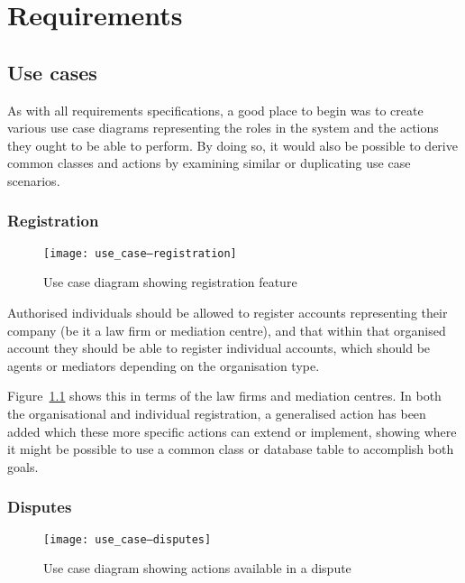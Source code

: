 \chapter{Requirements}

\section{Use cases}

As with all requirements specifications, a good place to begin was to create various use case diagrams representing the roles in the system and the actions they ought to be able to perform. By doing so, it would also be possible to derive common classes and actions by examining similar or duplicating use case scenarios.

\subsection{Registration}

\begin{figure}[h!]
  \centering
    \ifimages
    \texttt{[image: use\_case--registration]}
    \fi
  \caption{Use case diagram showing registration feature}
  \label{uml:useCase:registration}
\end{figure}

Authorised individuals should be allowed to register accounts representing their company (be it a law firm or mediation centre), and that within that organised account they should be able to register individual accounts, which should be agents or mediators depending on the organisation type.

Figure~\ref{uml:useCase:registration} shows this in terms of the law firms and mediation centres. In both the organisational and individual registration, a generalised action has been added which these more specific actions can extend or implement, showing where it might be possible to use a common class or database table to accomplish both goals.

\subsection{Disputes}

\begin{figure}[h!]
  \centering
    \ifimages
    \texttt{[image: use\_case--disputes]}
    \fi
  \caption{Use case diagram showing actions available in a dispute}
  \label{uml:useCase:disputes}
\end{figure}

